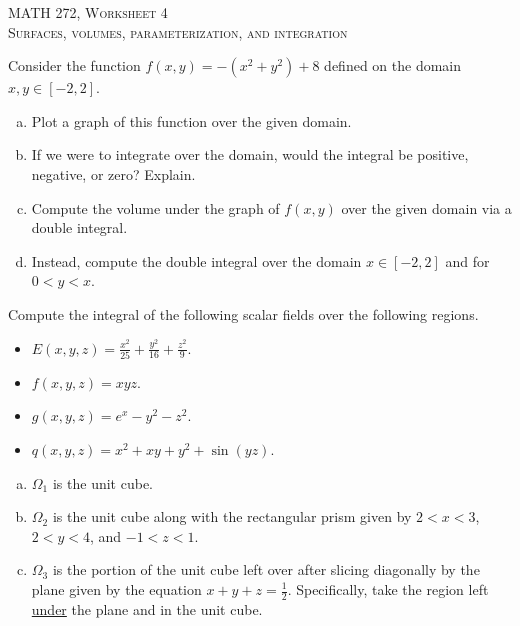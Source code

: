 \documentclass[12pt]{article} %
\begin{document}
\begin{center}
   \textsc{\large MATH 272, Worksheet 4}\\
   \textsc{Surfaces, volumes, parameterization, and integration}
\end{center}
\vspace{.5cm}

\begin{problem}
Consider the function $f(x,y)=-(x^2+y^2)+8$ defined on the domain $x,y \in [-2,2]$. 
\begin{enumerate}[(a)]
    \item Plot a graph of this function over the given domain.
    \item If we were to integrate over the domain, would the integral be positive, negative, or zero? Explain.
    \item Compute the volume under the graph of $f(x,y)$ over the given domain via a double integral.
    \item Instead, compute the double integral over the domain $x\in [-2,2]$ and for $0<y<x$. 
\end{enumerate}
\end{problem}



\begin{problem}
    Compute the integral of the following scalar fields over the following regions.
\begin{itemize}
    \item $E(x,y,z) = \frac{x^2}{25} + \frac{y^2}{16} + \frac{z^2}{9}$.
    \item $f(x,y,z) = xyz$.
    \item $g(x,y,z) = e^x-y^2-z^2$.
    \item $q(x,y,z) = x^2+xy+y^2+\sin(yz)$.
\end{itemize}
  \begin{multicols}{2}
  \begin{enumerate}[(a)]
      \item $\Omega_1$ is the unit cube.
      \item $\Omega_2$ is the unit cube along with the rectangular prism given by $2<x<3$, $2<y<4$, and $-1<z<1$.
      \item $\Omega_3$ is the portion of the unit cube left over after slicing diagonally by the plane given by the equation $x+y+z=\frac{1}{2}$. Specifically, take the region left \underline{under} the plane and in the unit cube.
  \end{enumerate}
  \end{multicols}  
\end{problem}
\end{document}
